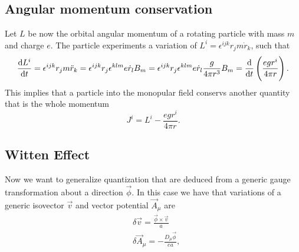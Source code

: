 \documentclass[main.tex]{subfiles}
\begin{document}
\subsection{Angular momentum conservation}
Let $L$ be now the orbital angular momentum of a rotating particle with mass $m$ and charge $e$. The particle experiments a variation of $L^i=\epsilon^{ijk}r_jm\dot r_k$, such that
\begin{align}
\dv{L^i}{t}=\epsilon^{ijk}r_jm\ddot r_k=\epsilon^{ijk}r_j\epsilon^{klm}e\dot r_lB_m=\epsilon^{ijk}r_j\epsilon^{klm}e\dot r_l\frac{g}{4\pi r^3}B_m=\dv{}{t}\left(\frac{egr^i}{4\pi r}\right).
\end{align}
This implies that a particle into the monopular field conservs another quantity that is the whole momentum
\begin{equation}
J^i=L^i-\frac{egr^i}{4\pi r}.
\end{equation}
\subsection{Witten Effect}
Now we want to generalize quantization that are deduced from a generic gauge transformation about a direction $\vec\phi$. In this case we have that variations of a generic isovector $\vec v$ and vector potential $\vec A_\mu$ are
\begin{subequations}
\begin{align}
&\delta\vec v=\frac{\vec\phi\times\vec v}{a}\\
&\delta\vec A_\mu=-\frac{D_\mu\vec\phi}{ea},
\end{align}
\end{subequations}
\end{document}
